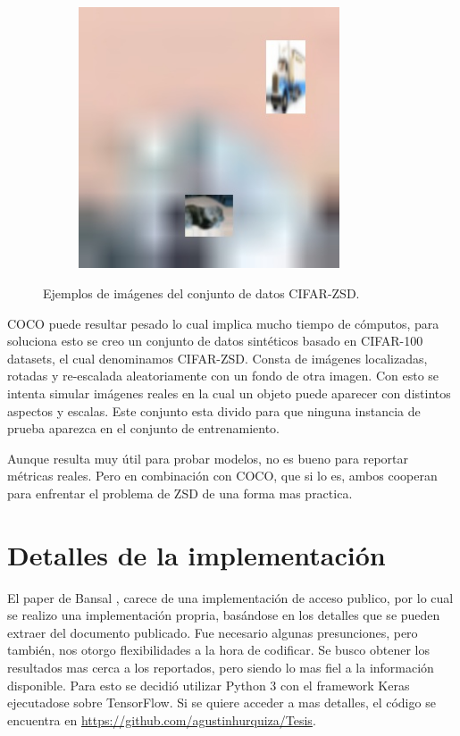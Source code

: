 \begin{figure}[H]
\begin{center}
	\begin{subfigure}{.3\textwidth}
		\includegraphics[width=0.85\textwidth]{img/cifar-zsd-test283.jpg}
		\label{fig:ex3}
	\end{subfigure}
	\caption{Ejemplos de imágenes del conjunto de datos CIFAR-ZSD.}
	\label{fig:CIFAR-ZSD}
	\end{center}
\end{figure}

COCO puede resultar pesado lo cual implica mucho tiempo de cómputos, para soluciona esto se creo un conjunto de datos sintéticos basado en CIFAR-100 datasets, el cual denominamos CIFAR-ZSD. Consta de imágenes localizadas, rotadas y re-escalada aleatoriamente con un fondo de otra imagen. Con esto se intenta simular imágenes reales en la cual un objeto puede aparecer con distintos aspectos y escalas. Este conjunto esta divido para que ninguna instancia de prueba  aparezca en el conjunto de entrenamiento.

Aunque resulta muy útil para probar modelos, no es bueno para reportar métricas reales. Pero en combinación con COCO, que si lo es, ambos cooperan para enfrentar el problema de ZSD de una forma mas practica.

\section{Detalles de la implementación}

El paper de Bansal \cite{bansal2018zero}, carece de una implementación de acceso publico, por lo cual se realizo una implementación propria, basándose en los detalles que se pueden extraer del documento publicado. Fue necesario algunas presunciones, pero también, nos otorgo flexibilidades a la hora de codificar. Se busco obtener los resultados mas cerca a los reportados, pero siendo lo mas fiel a la información disponible. Para esto se decidió utilizar Python 3 con el framework Keras ejecutadose sobre TensorFlow. Si se quiere acceder a mas detalles, el código se encuentra en \url{https://github.com/agustinhurquiza/Tesis}.\\

